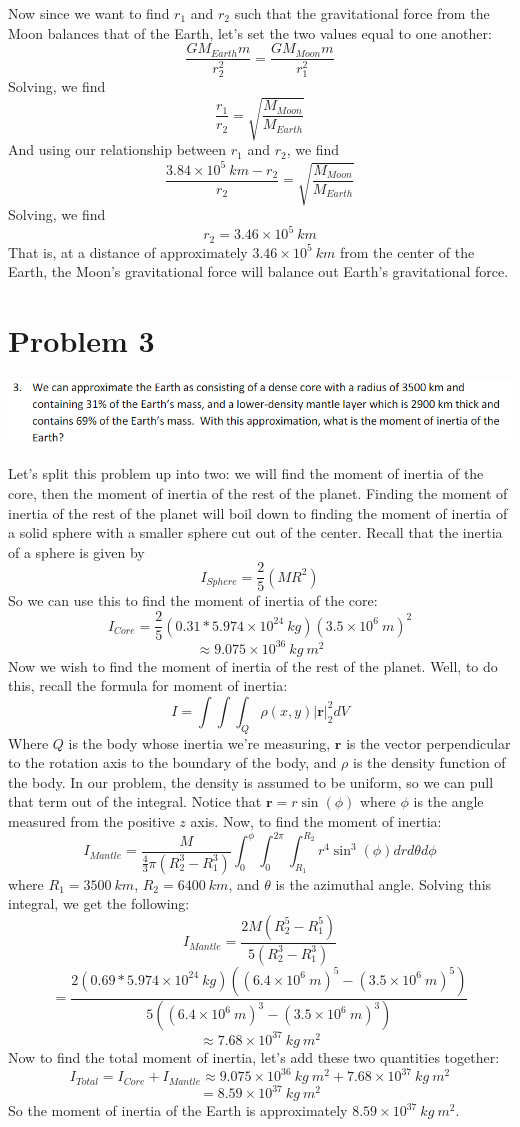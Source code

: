 \documentclass{article}
\begin{document}
Now since we want to find $r_1$ and $r_2$ such that the gravitational force from the Moon balances that of the Earth, let's set the two values equal to one another:
\[\frac{GM_{Earth}m}{r_2^2} = \frac{GM_{Moon}m}{r_1^2}\]
Solving, we find
\[\frac{r_1}{r_2} = \sqrt{\frac{M_{Moon}}{M_{Earth}}}\]
And using our relationship between $r_1$ and $r_2$, we find
\[\frac{3.84 \times 10^5 \: km - r_2}{r_2} = \sqrt{\frac{M_{Moon}}{M_{Earth}}}\]
Solving, we find
\[r_2 = 3.46 \times 10^{5} \: km\]
That is, at a distance of approximately $3.46 \times 10^5 \: km$ from the center of the Earth, the Moon's gravitational force will balance out Earth's gravitational force.


\section{Problem 3}
\includegraphics[scale = 0.8]{probset4prob3.PNG}

Let's split this problem up into two: we will find the moment of inertia of the core, then the moment of inertia of the rest of the planet. Finding the moment of inertia of the rest of the planet will boil down to finding the moment of inertia of a solid sphere with a smaller sphere cut out of the center. Recall that the inertia of a sphere is given by
\[I_{Sphere} = \frac{2}{5}(MR^2)\]
So we can use this to find the moment of inertia of the core:
\[I_{Core} = \frac{2}{5}(0.31*5.974 \times 10^{24} \:kg)(3.5 \times 10^6 \: m)^2\]
\[ \approx 9.075 \times 10^{36} \:kg \:m^2\]
Now we wish to find the moment of inertia of the rest of the planet. Well, to do this, recall the formula for moment of inertia:
\[I = \int{\int{\int_Q{ \rho (x,y) |\textbf{r}|_2^2 dV}}}\]
Where $Q$ is the body whose inertia we're measuring, $\textbf{r}$ is the vector perpendicular to the rotation axis to the boundary of the body, and $\rho$ is the density function of the body. In our problem, the density is assumed to be uniform, so we can pull that term out of the integral. Notice that $\textbf{r} = r\sin{(\phi)}$ where $\phi$ is the angle measured from the positive $z$ axis. Now, to find the moment of inertia:
\[I_{Mantle} = \frac{M}{\frac{4}{3}\pi (R_2^3 - R_1^3)}\int_0^{\phi}\int_0^{2\pi}\int_{R_1}^{R_2}r^4 \sin^3(\phi) dr d\theta d\phi\]
where $R_1 = 3500 \:km$, $R_2 = 6400 \:km$, and $\theta$ is the azimuthal angle. Solving this integral, we get the following:
\[I_{Mantle} = \frac{2M(R_2^5 - R_1^5)}{5(R_2^3 - R_1^3)}\]
\[ = \frac{2(0.69 * 5.974 \times 10^{24} \:kg)((6.4 \times 10^{6} \: m)^5 - (3.5 \times 10^6 \: m)^5)}{5((6.4 \times 10^6 \:m)^3 - (3.5 \times 10^6 \:m)^3)}\]
\[\approx 7.68 \times 10^{37} \:kg \:m^2\]
Now to find the total moment of inertia, let's add these two quantities together:
\[I_{Total} = I_{Core} + I_{Mantle} \approx 9.075 \times 10^{36} \:kg \:m^2 + 7.68 \times 10^{37} \:kg \:m^2\]
\[ = 8.59 \times 10^{37} \:kg \:m^2\]
So the moment of inertia of the Earth is approximately $8.59 \times 10^{37} \:kg \:m^2$.
\end{document}
